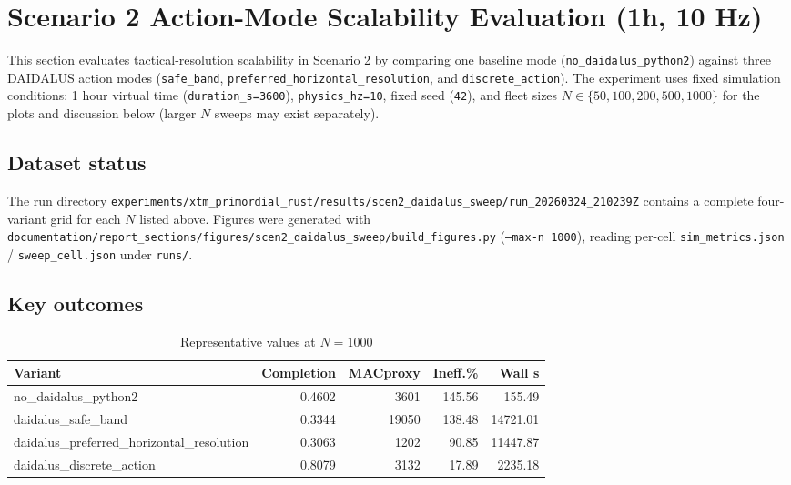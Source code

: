 \section{Scenario 2 Action-Mode Scalability Evaluation (1h, 10 Hz)}
\label{sec:scen2_sweep}

This section evaluates tactical-resolution scalability in Scenario 2 by comparing one baseline mode (\texttt{no\_daidalus\_python2}) against three DAIDALUS action modes (\texttt{safe\_band}, \texttt{preferred\_horizontal\_resolution}, and \texttt{discrete\_action}).
The experiment uses fixed simulation conditions: 1 hour virtual time (\texttt{duration\_s=3600}), \texttt{physics\_hz=10}, fixed seed (\texttt{42}), and fleet sizes $N \in \{50,100,200,500,1000\}$ for the plots and discussion below (larger $N$ sweeps may exist separately).

\subsection{Dataset status}

The run directory
\texttt{experiments/xtm\_primordial\_rust/results/scen2\_daidalus\_sweep/run\_20260324\_210239Z}
contains a complete four-variant grid for each $N$ listed above.
Figures were generated with \texttt{documentation/report\_sections/figures/scen2\_daidalus\_sweep/build\_figures.py} (\texttt{--max-n 1000}), reading per-cell \texttt{sim\_metrics.json} / \texttt{sweep\_cell.json} under \texttt{runs/}.

\subsection{Key outcomes}

\begin{table}[htbp]
\caption{Representative values at $N=1000$}
\label{tab:scen2_n1000}
\begin{center}
\begin{tabular}{|l|r|r|r|r|}
\hline
\textbf{Variant} & \textbf{Completion} & \textbf{MACproxy} & \textbf{Ineff.\%} & \textbf{Wall s} \\
\hline
no\_daidalus\_python2 & 0.4602 & 3601  & 145.56 & 155.49 \\
daidalus\_safe\_band   & 0.3344 & 19050 & 138.48 & 14721.01 \\
daidalus\_preferred\_horizontal\_resolution & 0.3063 & 1202 & 90.85 & 11447.87 \\
daidalus\_discrete\_action & 0.8079 & 3132 & 17.89 & 2235.18 \\
\hline
\end{tabular}
\end{center}
\end{table}

